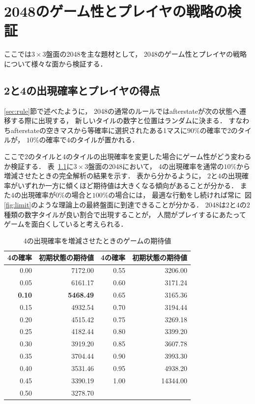 \chapter{2048のゲーム性とプレイヤの戦略の検証}
ここでは$3\times3$盤面の2048を主な題材として， 2048のゲーム性とプレイヤの戦略について様々な面から検証する．

\section{2と4の出現確率とプレイヤの得点}
\ref{sec:rule}節で述べたように， 2048の通常のルールではafterstateが次の状態へ遷移する際に出現する， 新しいタイルの数字と位置はランダムに決まる．
すなわちafterstateの空きマスから等確率に選択されたある1マスに$90\%$の確率で$2$のタイルが， $10\%$の確率で$4$のタイルが置かれる．

ここで$2$のタイルと$4$のタイルの出現確率を変更した場合にゲーム性がどう変わるか検証する．
表~\ref{table: value_table}に$3 \times 3$盤面の2048において， $4$の出現確率を通常の$10\%$から増減させたときの完全解析の結果を示す．
表から分かるように， $2$と$4$の出現確率がいずれか一方に傾くほど期待値は大きくなる傾向があることが分かる．
また$4$の出現確率が$0\%$の場合と$100\%$の場合には， 最適な行動をし続ければ常に~図\ref{fig:limit}のような理論上の最終盤面に到達できることが分かる．
2048は$2$と$4$の$2$種類の数字タイルが良い割合で出現することが， 人間がプレイするにあたってゲームを面白くしていると考えられる．
\begin{table}[t]
\caption{4の出現確率を増減させたときのゲームの期待値}
\label{table: value_table}
\centering
\begin{tabular}{r|r||r|r}
    \hline \hline
    4の確率 & 初期状態の期待値 & 4の確率 & 初期状態の期待値 \\ \hline 
    0.00 & 7172.00 & 0.55 & 3206.00 \\
    0.05 & 6161.17 & 0.60 & 3171.24 \\
    \textbf{0.10} & \textbf{5468.49} & 0.65 & 3165.36 \\
    0.15 & 4932.54 & 0.70 & 3194.44 \\
    0.20 & 4515.42 & 0.75 & 3269.18 \\
    0.25 & 4182.44 & 0.80 & 3399.20 \\
    0.30 & 3919.20 & 0.85 & 3607.78 \\
    0.35 & 3704.44 & 0.90 & 3993.30 \\
    0.40 & 3531.46 & 0.95 & 4938.20 \\
    0.45 & 3390.19 & 1.00 & 14344.00 \\
    0.50 & 3278.70 &  & \\
    \hline
\end{tabular}
\end{table}

